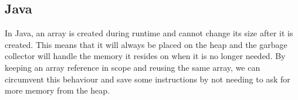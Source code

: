 %

\subsection{Java}
In Java, an array is created during runtime and cannot change its size after it is created. This means that it will always be placed on the heap and the garbage collector will handle the memory it resides on when it is no longer needed. By keeping an array reference in scope and reusing the same array, we can circumvent this behaviour and save some instructions by not needing to ask for more memory from the heap.


